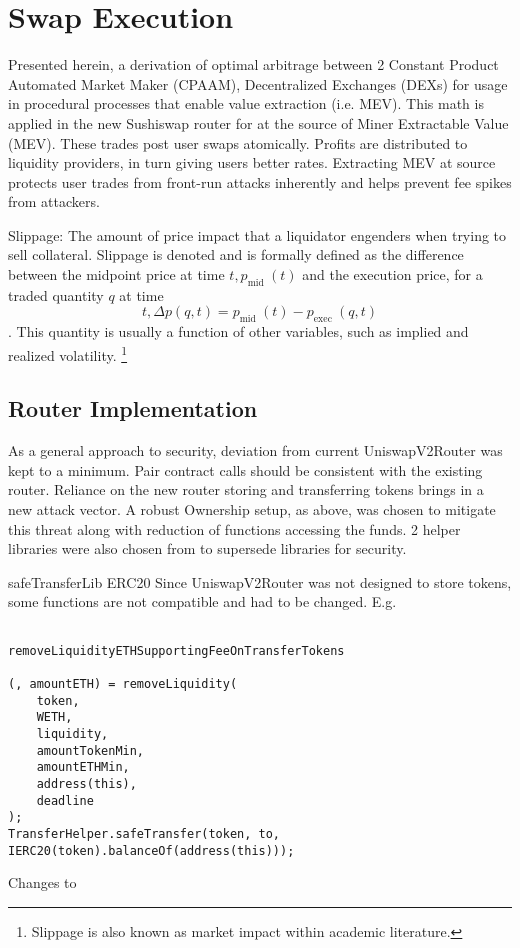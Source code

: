 \documentclass[runningheads]{llncs}
\begin{document}
\section{Swap Execution}


Presented herein, a derivation of optimal arbitrage between 2 Constant Product Automated Market Maker (CPAAM), Decentralized Exchanges (DEXs) for usage in procedural processes that enable value extraction (i.e. MEV).
This math is applied in the new Sushiswap router for at the source of  Miner Extractable Value (MEV). These trades post user swaps atomically.
Profits are distributed to liquidity providers, in turn giving users better rates. Extracting MEV at source protects user trades from front-run attacks inherently and helps prevent fee spikes from attackers.


Slippage: The amount of price impact that a liquidator engenders when trying to sell collateral.
Slippage is denoted  and is formally defined as the difference between the midpoint price at time $t, p_{\text {mid }}(t)$ and the execution price,   for a traded quantity $q$ at time $$t, \Delta p(q, t)=p_{\text {mid }}(t)-p_{\text {exec }}(q, t)$$. This quantity is usually a function of other variables, such as implied and realized volatility.
\footnote{Slippage is also known as market impact within academic literature.}


\subsection{Router Implementation}
As a general approach to security, deviation from current UniswapV2Router was kept to a minimum. Pair contract calls should be consistent with the existing router. Reliance on the new router storing and transferring tokens brings in a new attack vector. A robust Ownership setup, as above, was chosen to mitigate this threat along with reduction of functions accessing the funds. 2 helper libraries were also chosen from  to supersede  libraries for security.

safeTransferLib
ERC20
Since UniswapV2Router was not designed to store tokens, some functions are not compatible and had to be changed. E.g.

\begin{verbatim}

removeLiquidityETHSupportingFeeOnTransferTokens

(, amountETH) = removeLiquidity(
    token,
    WETH,
    liquidity,
    amountTokenMin,
    amountETHMin,
    address(this),
    deadline
);
TransferHelper.safeTransfer(token, to, IERC20(token).balanceOf(address(this)));
\end{verbatim}
Changes to
\end{document}
